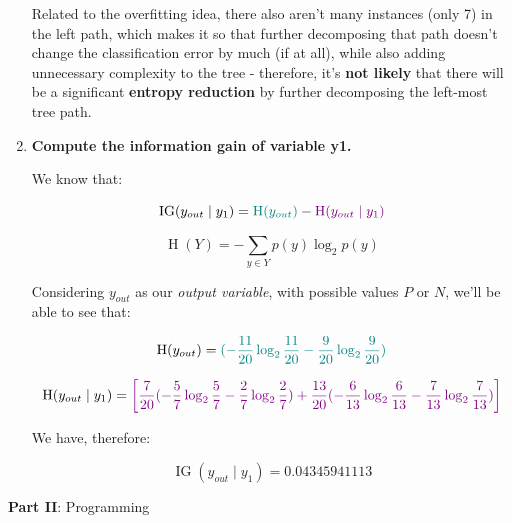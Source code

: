 \documentclass[12pt]{article}
\begin{document}
\begin{enumerate}[leftmargin=\labelsep]
Related to the overfitting idea, there also aren't many instances (only 7) in the
left path, which makes it so that further decomposing that path doesn't change
the classification error by much (if at all), while also adding unnecessary
complexity to the tree - therefore, it's \textbf{not likely} that there will be a significant
\textbf{entropy reduction} by further decomposing the left-most tree path.

\item \textbf{Compute the information gain of variable y1.}

We know that:

\begin{equation}
  \operatorname{IG}(y_{out} \mid y_1) = \textcolor{teal}{\operatorname{H}(y_{out})} - \textcolor{violet}{\operatorname{H}(y_{out} \mid y_1)}
\end{equation}

\begin{equation}
  \operatorname{H}(Y) = -\sum_{y \in Y} p(y) \log_2 p(y)
\end{equation}

Considering $y_{out}$ as our \textit{output variable}, with possible values $P$ or $N$,
we'll be able to see that:

\begin{equation}
  \operatorname{H}(y_{out}) = \textcolor{teal}{(- \frac{11}{20} \log_2 \frac{11}{20} - \frac{9}{20} \log_2 \frac{9}{20})}
\end{equation}

\begin{equation}
  \operatorname{H}(y_{out} \mid y_1) = \textcolor{violet}{\left[\frac{7}{20}(- {\frac{5}{7}} \log_2 \frac{5}{7} - \frac{2}{7} \log_2 \frac{2}{7}) + \frac{13}{20}(- \frac{6}{13} \log_2 \frac{6}{13} - \frac{7}{13} \log_2 \frac{7}{13})\right]}
\end{equation}

We have, therefore:

$$
\operatorname{IG}(y_{out} \mid y_1) = 0.04345941113
$$

\end{enumerate}

\center\large{\textbf{Part II}: Programming}
\end{document}
